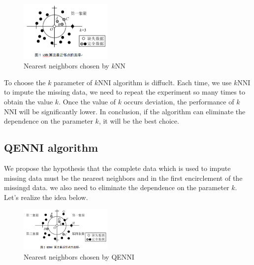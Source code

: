 \documentclass[print]{jicspack}
\begin{document}
\begin{figure}[h]
\centering
\includegraphics[angle=0, width=0.4\textwidth]{figure1.png}
\caption{Nearest neighbors chosen by $k$NN}
\label{fig:figure1}
\end{figure}

To choose the $k$ parameter of $k$NNI algorithm is diffuclt. Each time, we use $k$NNI to impute the missing data, we need to repeat the experiment so many times to obtain the value $k$. Once the value of $k$ occurs deviation, the performance of $k$NNI will be significantly lower. In conclusion, if the algorithm can eliminate the dependence on the parameter $k$, it will be the best choice.

\subsection{QENNI algorithm}
\label{2.3}
We propose the hypothesis that the complete data which is used to impute missing data must be the nearest neighbors and in the first encirclement of the missingd data. we also need to eliminate the dependence on the parameter $k$. Let's realize the idea below.

\begin{figure}[h]
\centering
\includegraphics[angle=0, width=0.4\textwidth]{figure2.png}
\caption{Nearest neighbors chosen by QENNI}
\label{fig:figure2}
\end{figure}
\end{document}
